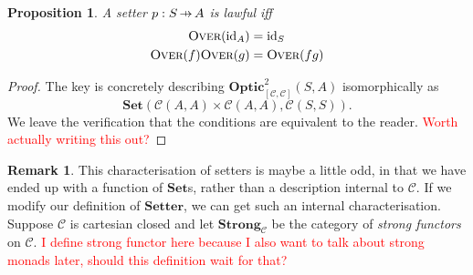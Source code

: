 \documentclass[11pt,letterpaper]{article}
\theoremstyle{plain}
\newtheorem{proposition}[theorem]{Proposition}
\theoremstyle{definition}
\newtheorem{remark}[theorem]{Remark}
\newcommand{\C}{\mathscr{C}}
\newcommand{\Set}{\mathbf{Set}}
\newcommand{\Strong}{\mathbf{Strong}}
\newcommand{\Twoptic}{\mathbf{Optic}^2}
\newcommand{\Setter}{\mathbf{Setter}}
\newcommand{\id}{\mathrm{id}}
\newcommand{\fover}{\textsc{Over}}
\newcommand{\hto}{\ensuremath{\,\mathaccent\shortmid\rightarrow\,}}
\newcommand{\todo}[1]{\textcolor{red}{\small #1}}
\begin{document}
\begin{proposition}
A setter $p : S \hto A$ is lawful iff
\begin{align*}
\fover(\id_A) &= \id_S \\
\fover(f)\fover(g)&= \fover(fg)
\end{align*}
\end{proposition}
\begin{proof}
The key is concretely describing $\Twoptic_{[\C, \C]}(S, A)$ isomorphically as \[ \Set( \C(A, A) \times \C(A, A), \C(S, S) ).\] We leave the verification that the conditions are equivalent to the reader. \todo{Worth actually writing this out?}
\end{proof}

\begin{remark}
This characterisation of setters is maybe a little odd, in that we have ended up with a function of $\Set$s, rather than a description internal to $\C$. If we modify our definition of $\Setter$, we can get such an internal characterisation. Suppose $\C$ is cartesian closed and let $\Strong_\C$ be the category of \emph{strong functors} on $\C$. \todo{I define strong functor here because I also want to talk about strong monads later, should this definition wait for that?}


\end{remark}
\end{document}
